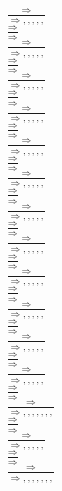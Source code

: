 \documentclass[11pt]{article}
\begin{document}
\begin{center}
\bigskip
\\$\frac{\Rightarrow }{\Rightarrow , , , , , }$
\bigskip
\\$\frac{\Rightarrow }{\Rightarrow }$
\bigskip
\\$\frac{\Rightarrow }{\Rightarrow , , , , , }$
\bigskip
\\$\frac{\Rightarrow }{\Rightarrow }$
\bigskip
\\$\frac{\Rightarrow }{\Rightarrow , , , , , }$
\bigskip
\\$\frac{\Rightarrow }{\Rightarrow }$
\bigskip
\\$\frac{\Rightarrow }{\Rightarrow , , , , , }$
\bigskip
\\$\frac{\Rightarrow }{\Rightarrow }$
\bigskip
\\$\frac{\Rightarrow }{\Rightarrow , , , , , }$
\bigskip
\\$\frac{\Rightarrow }{\Rightarrow }$
\bigskip
\\$\frac{\Rightarrow }{\Rightarrow , , , , , }$
\bigskip
\\$\frac{\Rightarrow }{\Rightarrow }$
\bigskip
\\$\frac{\Rightarrow }{\Rightarrow , , , , , }$
\bigskip
\\$\frac{\Rightarrow }{\Rightarrow }$
\bigskip
\\$\frac{\Rightarrow }{\Rightarrow , , , , , }$
\bigskip
\\$\frac{\Rightarrow }{\Rightarrow }$
\bigskip
\\$\frac{\Rightarrow }{\Rightarrow , , , , , }$
\bigskip
\\$\frac{\Rightarrow }{\Rightarrow }$
\bigskip
\\$\frac{\Rightarrow }{\Rightarrow , , , , , }$
\bigskip
\\$\frac{\Rightarrow }{\Rightarrow }$
\bigskip
\\$\frac{\Rightarrow }{\Rightarrow , , , , , }$
\bigskip
\\$\frac{\Rightarrow }{\Rightarrow }$
\bigskip
\\$\frac{\Rightarrow }{\Rightarrow , , , , , }$
\bigskip
\\$\frac{\Rightarrow }{\Rightarrow }$
\bigskip
\\$\frac{\Rightarrow }{\Rightarrow , , , , , , , }$
\bigskip
\\$\frac{\Rightarrow }{\Rightarrow }$
\bigskip
\\$\frac{\Rightarrow }{\Rightarrow , , , , , }$
\bigskip
\\$\frac{\Rightarrow }{\Rightarrow }$
\bigskip
\\$\frac{\Rightarrow }{\Rightarrow , , , , , , , }$

\end{center}
\end{document}
